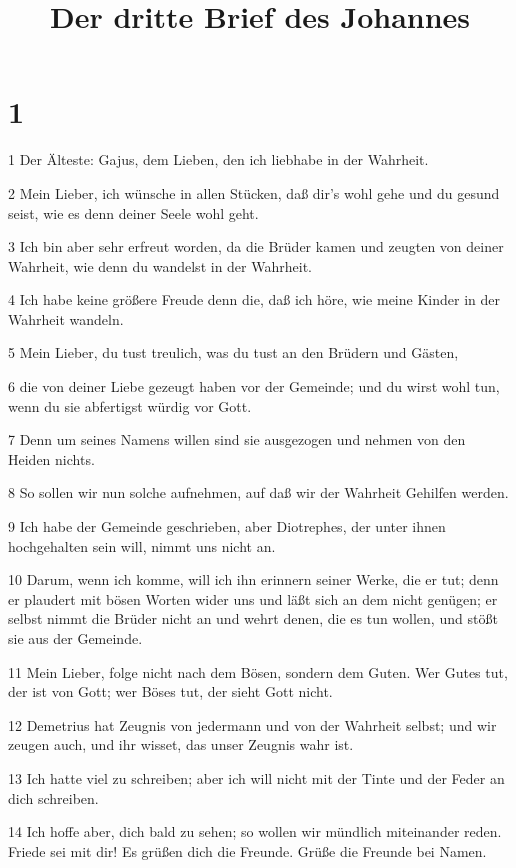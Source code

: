 

\title{Der dritte Brief des Johannes}


\chapter{1}

\par 1 Der Älteste: Gajus, dem Lieben, den ich liebhabe in der Wahrheit.
\par 2 Mein Lieber, ich wünsche in allen Stücken, daß dir's wohl gehe und du gesund seist, wie es denn deiner Seele wohl geht.
\par 3 Ich bin aber sehr erfreut worden, da die Brüder kamen und zeugten von deiner Wahrheit, wie denn du wandelst in der Wahrheit.
\par 4 Ich habe keine größere Freude denn die, daß ich höre, wie meine Kinder in der Wahrheit wandeln.
\par 5 Mein Lieber, du tust treulich, was du tust an den Brüdern und Gästen,
\par 6 die von deiner Liebe gezeugt haben vor der Gemeinde; und du wirst wohl tun, wenn du sie abfertigst würdig vor Gott.
\par 7 Denn um seines Namens willen sind sie ausgezogen und nehmen von den Heiden nichts.
\par 8 So sollen wir nun solche aufnehmen, auf daß wir der Wahrheit Gehilfen werden.
\par 9 Ich habe der Gemeinde geschrieben, aber Diotrephes, der unter ihnen hochgehalten sein will, nimmt uns nicht an.
\par 10 Darum, wenn ich komme, will ich ihn erinnern seiner Werke, die er tut; denn er plaudert mit bösen Worten wider uns und läßt sich an dem nicht genügen; er selbst nimmt die Brüder nicht an und wehrt denen, die es tun wollen, und stößt sie aus der Gemeinde.
\par 11 Mein Lieber, folge nicht nach dem Bösen, sondern dem Guten. Wer Gutes tut, der ist von Gott; wer Böses tut, der sieht Gott nicht.
\par 12 Demetrius hat Zeugnis von jedermann und von der Wahrheit selbst; und wir zeugen auch, und ihr wisset, das unser Zeugnis wahr ist.
\par 13 Ich hatte viel zu schreiben; aber ich will nicht mit der Tinte und der Feder an dich schreiben.
\par 14 Ich hoffe aber, dich bald zu sehen; so wollen wir mündlich miteinander reden. Friede sei mit dir! Es grüßen dich die Freunde. Grüße die Freunde bei Namen.

